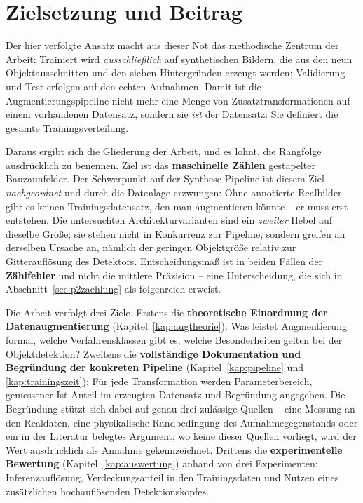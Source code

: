 \section{Zielsetzung und Beitrag}

Der hier verfolgte Ansatz macht aus dieser Not das methodische Zentrum der
Arbeit: Trainiert wird \emph{ausschließlich} auf synthetischen Bildern, die aus
den neun Objektausschnitten und den sieben Hintergründen erzeugt werden;
Validierung und Test erfolgen auf den echten Aufnahmen. Damit ist die
Augmentierungspipeline nicht mehr eine Menge von Zusatztransformationen auf einem
vorhandenen Datensatz, sondern sie \emph{ist} der Datensatz: Sie definiert die
gesamte Trainingsverteilung.

Daraus ergibt sich die Gliederung der Arbeit, und es lohnt, die Rangfolge
ausdrücklich zu benennen. Ziel ist das \textbf{maschinelle Zählen} gestapelter
Bauzaunfelder. Der Schwerpunkt auf der Synthese-Pipeline ist diesem Ziel
\emph{nachgeordnet} und durch die Datenlage erzwungen: Ohne annotierte Realbilder
gibt es keinen Trainingsdatensatz, den man augmentieren könnte -- er muss erst
entstehen. Die untersuchten Architekturvarianten sind ein \emph{zweiter} Hebel
auf dieselbe Größe; sie stehen nicht in Konkurrenz zur Pipeline, sondern greifen
an derselben Ursache an, nämlich der geringen Objektgröße relativ zur
Gitterauflösung des Detektors. Entscheidungsmaß ist in beiden Fällen der
\textbf{Zählfehler} und nicht die mittlere Präzision -- eine Unterscheidung, die
sich in Abschnitt~\ref{sec:p2zaehlung} als folgenreich erweist.

Die Arbeit verfolgt drei Ziele. Erstens die \textbf{theoretische Einordnung der
Datenaugmentierung} (Kapitel~\ref{kap:augtheorie}): Was leistet Augmentierung
formal, welche Verfahrensklassen gibt es, welche Besonderheiten gelten bei der
Objektdetektion? Zweitens die \textbf{vollständige Dokumentation und Begründung
der konkreten Pipeline} (Kapitel~\ref{kap:pipeline} und
\ref{kap:trainingszeit}): Für jede Transformation werden Parameterbereich,
gemessener Ist-Anteil im erzeugten Datensatz und Begründung angegeben. Die
Begründung stützt sich dabei auf genau drei zulässige Quellen -- eine Messung an
den Realdaten, eine physikalische Randbedingung des Aufnahmegegenstands oder ein
in der Literatur belegtes Argument; wo keine dieser Quellen vorliegt, wird der
Wert ausdrücklich als Annahme gekennzeichnet. Drittens die
\textbf{experimentelle Bewertung} (Kapitel~\ref{kap:auswertung}) anhand von drei
Experimenten: Inferenzauflösung, Verdeckungsanteil in den Trainingsdaten und
Nutzen eines zusätzlichen hochauflösenden Detektionskopfes.

